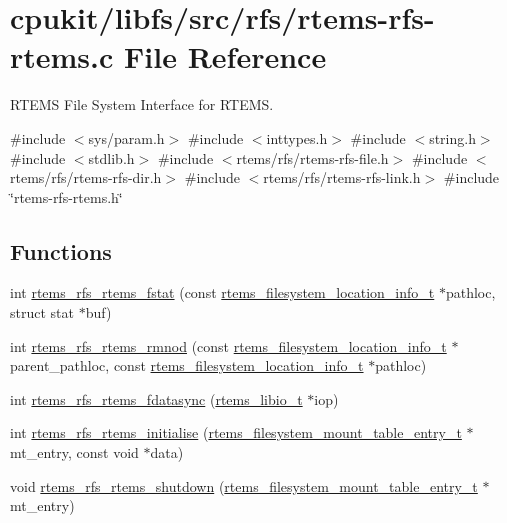 \hypertarget{rtems-rfs-rtems_8c}{}\section{cpukit/libfs/src/rfs/rtems-\/rfs-\/rtems.c File Reference}
\label{rtems-rfs-rtems_8c}


R\+T\+E\+MS File System Interface for R\+T\+E\+MS.  


{\ttfamily \#include $<$sys/param.\+h$>$}\newline
{\ttfamily \#include $<$inttypes.\+h$>$}\newline
{\ttfamily \#include $<$string.\+h$>$}\newline
{\ttfamily \#include $<$stdlib.\+h$>$}\newline
{\ttfamily \#include $<$rtems/rfs/rtems-\/rfs-\/file.\+h$>$}\newline
{\ttfamily \#include $<$rtems/rfs/rtems-\/rfs-\/dir.\+h$>$}\newline
{\ttfamily \#include $<$rtems/rfs/rtems-\/rfs-\/link.\+h$>$}\newline
{\ttfamily \#include \char`\"{}rtems-\/rfs-\/rtems.\+h\char`\"{}}\newline
\subsection*{Functions}
\begin{DoxyCompactItemize}
\item 
int \mbox{\hyperlink{rtems-rfs-rtems_8c_a0ceaa395fe3f5ea0c01383618faa3b5c}{rtems\+\_\+rfs\+\_\+rtems\+\_\+fstat}} (const \mbox{\hyperlink{group__LibIO_ga3252b3d31ee3c49ffff0b7604a676864}{rtems\+\_\+filesystem\+\_\+location\+\_\+info\+\_\+t}} $\ast$pathloc, struct stat $\ast$buf)
\item 
int \mbox{\hyperlink{rtems-rfs-rtems_8c_acb8e7e6615d937f61862719b00445978}{rtems\+\_\+rfs\+\_\+rtems\+\_\+rmnod}} (const \mbox{\hyperlink{group__LibIO_ga3252b3d31ee3c49ffff0b7604a676864}{rtems\+\_\+filesystem\+\_\+location\+\_\+info\+\_\+t}} $\ast$parent\+\_\+pathloc, const \mbox{\hyperlink{group__LibIO_ga3252b3d31ee3c49ffff0b7604a676864}{rtems\+\_\+filesystem\+\_\+location\+\_\+info\+\_\+t}} $\ast$pathloc)
\item 
int \mbox{\hyperlink{rtems-rfs-rtems_8c_afea85d020da25d7bba8b14906c58a74a}{rtems\+\_\+rfs\+\_\+rtems\+\_\+fdatasync}} (\mbox{\hyperlink{structrtems__libio__tt}{rtems\+\_\+libio\+\_\+t}} $\ast$iop)
\item 
int \mbox{\hyperlink{group__rtems__rfs_gaf07230e2a00d753c32235965ba8ca4ad}{rtems\+\_\+rfs\+\_\+rtems\+\_\+initialise}} (\mbox{\hyperlink{structrtems__filesystem__mount__table__entry__tt}{rtems\+\_\+filesystem\+\_\+mount\+\_\+table\+\_\+entry\+\_\+t}} $\ast$mt\+\_\+entry, const void $\ast$data)
\item 
void \mbox{\hyperlink{rtems-rfs-rtems_8c_ad07997e173229e14ef6de4efc1033a5b}{rtems\+\_\+rfs\+\_\+rtems\+\_\+shutdown}} (\mbox{\hyperlink{structrtems__filesystem__mount__table__entry__tt}{rtems\+\_\+filesystem\+\_\+mount\+\_\+table\+\_\+entry\+\_\+t}} $\ast$mt\+\_\+entry)
\end{DoxyCompactItemize}
